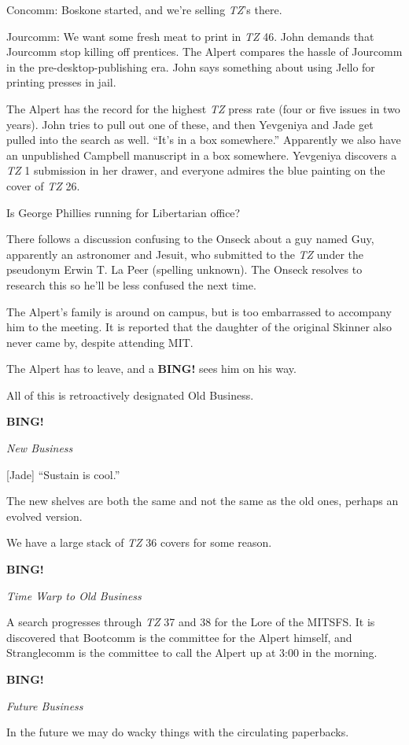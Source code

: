 \documentclass[12pt]{article}
\newcommand{\bing}{{\bf BING!} }
\newcommand{\goto}[1]{\bing \vskip 12pt \centerline{{\em{#1}}}}
\begin{document}
Concomm: Boskone started, and we're selling {\em TZ}'s there.

Jourcomm: We want some fresh meat to print in {\em TZ} 46.  John
demands that Jourcomm stop killing off prentices.  The Alpert compares
the hassle of Jourcomm in the pre-desktop-publishing era.  John says
something about using Jello for printing presses in jail.

The Alpert has the record for the highest {\em TZ} press rate (four
or five issues in two years).  John tries to pull out one of these,
and then Yevgeniya and Jade get pulled into the search as well.
``It's in a box somewhere.''  Apparently we also have an unpublished
Campbell manuscript in a box somewhere.  Yevgeniya discovers a {\em TZ}
1 submission in her drawer, and everyone admires the blue painting on
the cover of {\em TZ} 26.

Is George Phillies running for Libertarian office?

There follows a discussion confusing to the Onseck about a guy named
Guy, apparently an astronomer and Jesuit, who submitted to the {\em TZ}
under the pseudonym Erwin T. La Peer (spelling unknown).  The Onseck
resolves to research this so he'll be less confused the next time.

The Alpert's family is around on campus, but is too embarrassed to
accompany him to the meeting.  It is reported that the daughter of
the original Skinner also never came by, despite attending MIT.

The Alpert has to leave, and a \bing sees him on his way.

All of this is retroactively designated Old Business.

\goto{New Business}

[Jade] ``Sustain is cool.''

The new shelves are both the same and not the same as the old ones,
perhaps an evolved version.

We have a large stack of {\em TZ} 36 covers for some reason.

\goto{Time Warp to Old Business}

A search progresses through {\em TZ} 37 and 38 for the Lore of the
MITSFS.  It is discovered that Bootcomm is the committee for the
Alpert himself, and Stranglecomm is the committee to call the Alpert
up at 3:00 in the morning.

\goto{Future Business}

In the future we may do wacky things with the circulating paperbacks.
\end{document}
